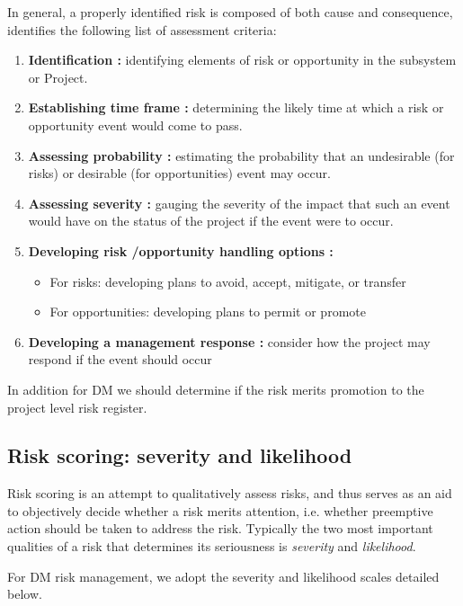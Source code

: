 In general, a properly identified risk is composed of both cause and consequence,  identifies the following list of assessment criteria:
\begin{enumerate}
\item \textbf{Identification : }
identifying elements of risk or opportunity in the subsystem or Project.
\item \textbf{Establishing  time  frame :}
    determining  the  likely  time at  which a  risk or  opportunity event would come to pass.
\item \textbf{Assessing  probability :  }
  estimating  the  probability  that  an  undesirable (for  risks)  or desirable (for opportunities) event may occur.
\item \textbf{Assessing  severity :}
   gauging  the  severity  of  the  impact  that  such  an  event  would  have on the status of the project if the event were to occur.
\item \textbf{Developing risk /opportunity handling options :}
\begin{itemize}
\item  For  risks: developing  plans to  avoid, accept, mitigate, or transfer
\item  For opportunities: developing plans to permit or promote
\end{itemize}

\item \textbf{Developing  a  management  response : }
 consider  how  the  project  may  respond  if  the event should occur
\end{enumerate}

In addition for DM we should determine if the risk merits promotion to the project level risk register.

\subsection{Risk scoring: severity and likelihood \label{sect:scoring}}

Risk scoring is an attempt to qualitatively assess risks, and thus serves as an aid to objectively decide whether a risk merits attention, i.e. whether preemptive action should be taken to address the risk. Typically the two most important qualities of a risk that determines its seriousness is \emph{severity} and \emph{likelihood}.

For DM risk management, we adopt the severity and likelihood scales detailed below.

